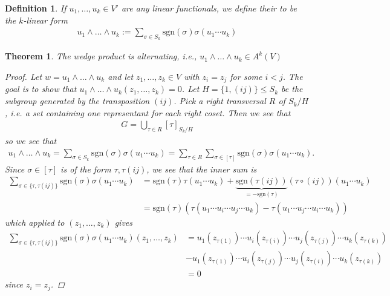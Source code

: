 \documentclass[10pt,twoside,openany,final]{memoir}
\def\sgn{\mathrm{sgn}}
\theoremstyle{break}
\newtheorem{theorem}[section]{Theorem}
\newtheorem{definition}[section]{Definition}
\theoremstyle{Break}
\let\emph\relax
\begin{document}
\begin{definition}
	If $u_1,\dots,u_k \in V'$ are any linear functionals, we define their \emph{wedge-product} to be the $k$-linear form
	\begin{align*}
		u_1 \land \dots \land u_k:= \sum_{\sigma \in S_k}\sgn(\sigma) \sigma(u_1 \cdots u_k)
	\end{align*}
\end{definition}

\begin{theorem}
	The wedge product is alternating, i.e.,  $u_1 \land \dots \land u_k\in A^k(V)$
	\begin{proof}
		Let $w=u_1 \land \dots \land u_k$ and let $z_1,\dots,z_k \in V$ with $z_i = z_j$ for some $i < j$. The goal is to show that $u_1\land \dots \land u_k(z_1,\dots,z_k)=0$. Let $H=\{1,(ij)\} \leq S_k$ be the subgroup generated by the transposition $(ij)$. Pick a right transversal $R$ of $S_k/H$, i.e. a set containing one representant for each right coset. Then we see that
		\begin{align*}
			G= \bigcup_{\tau \in R} [\tau]_{S_k/H}
		\end{align*}
		so we see that
		\begin{align*}
			u_1 \land \dots \land u_k=\sum_{\sigma \in S_k} \sgn(\sigma) \sigma(u_1\cdots u_k) = \sum_{\tau \in R} \sum_{\sigma \in [\tau]}\sgn(\sigma) \sigma(u_1\cdots u_k).
		\end{align*}
		Since $\sigma \in [\tau]$ is of the form ${\tau,\tau(ij)}$, we see that the inner sum is
		\begin{align*}
			\sum_{\sigma\in \{\tau,\tau(ij)\}} \sgn(\sigma) \sigma(u_1 \cdots u_k)&=\sgn(\tau)\tau(u_1 \cdots u_k)+\underbrace{\sgn(\tau(ij))}_{=-\sgn(\tau)}\left(\tau\circ(ij)\right)(u_1 \cdots u_k)\\
			&= \sgn(\tau)(\tau(u_1 \cdots u_i \cdots u_j \cdots u_k)- \tau(u_1 \cdots u_j \cdots u_i \cdots u_k))
		\end{align*}
		which applied to $(z_1,\dots,z_k)$ gives
		\begin{align*}
			\sum_{\sigma \in \{\tau,\tau(ij)\}} \sgn(\sigma)\sigma(u_1 \cdots u_k) (z_1,\dots,z_k)&=u_1(z_{\tau(1)})\cdots u_i(z_{\tau(i)})\cdots u_j(z_{\tau(j)})\cdots u_k(z_{\tau(k)})\\
			&- u_1(z_{\tau(1)})\cdots u_i(z_{\tau(j)}) \cdots u_j(z_{\tau(i)}) \cdots u_k(z_{\tau(k)})\\
			&=0
		\end{align*}
		since $z_i=z_j$.
	\end{proof}
\end{theorem}
\end{document}
